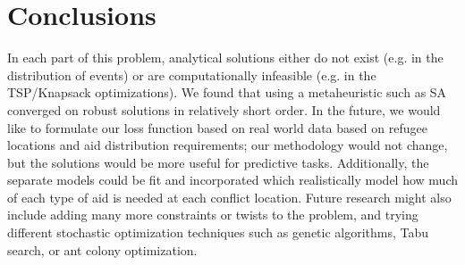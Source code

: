 \documentclass{article} %
\begin{document}
\section*{Conclusions}

In each part of this problem, analytical solutions either do not exist (e.g. in the distribution of events) or are computationally infeasible (e.g. in the TSP/Knapsack optimizations).  We found that using a metaheuristic such as SA converged on robust solutions in relatively short order. In the future, we would like to formulate our loss function based on real world data based on refugee locations and aid distribution requirements; our methodology would not change, but the solutions would be more useful for predictive tasks. Additionally, the separate models could be fit and incorporated which realistically model how much of each type of aid is needed at each conflict location. Future research might also include adding many more constraints or twists to the problem, and trying different stochastic optimization techniques such as genetic algorithms, Tabu search, or ant colony optimization.


\end{document}

